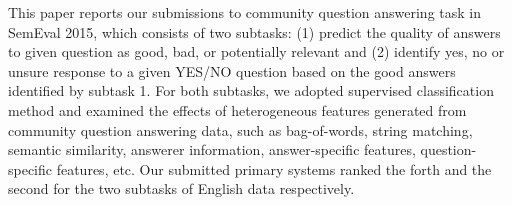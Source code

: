 This paper reports our submissions to community question answering task in SemEval 2015, which consists of two subtasks: (1) predict the quality of answers to given question as good, bad, or potentially relevant and (2) identify yes, no or unsure response to a given YES/NO question based on the good answers identified by subtask 1. For both subtasks, we adopted supervised classification method and examined the effects of heterogeneous features generated from community question answering data, such as bag-of-words, string matching, semantic similarity, answerer information, answer-specific features, question-specific features, etc. Our submitted primary systems ranked the forth and the second for the two subtasks of English data respectively.
